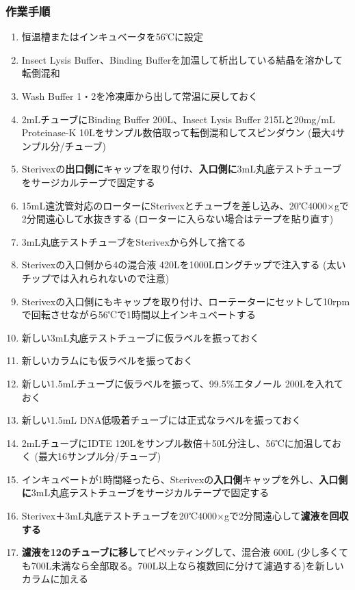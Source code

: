 \documentclass[titlepage,10pt,a4paper,uplatex]{jsbook}
\renewcommand{\textbf}[1]{{\bfseries\sffamily#1}}
\begin{document}
\subsubsection{作業手順}
\begin{enumerate}
\item 恒温槽またはインキュベータを56℃に設定
\item Insect Lysis Buffer、Binding Bufferを加温して析出している結晶を溶かして転倒混和
\item Wash Buffer 1・2を冷凍庫から出して常温に戻しておく
\item 2mLチューブにBinding Buffer 200{\textmu}L、Insect Lysis Buffer 215{\textmu}Lと20mg/mL Proteinase-K 10{\textmu}Lをサンプル数倍取って転倒混和してスピンダウン (最大4サンプル分/チューブ)
\item Sterivexの\textbf{出口側に}キャップを取り付け、\textbf{入口側に}3mL丸底テストチューブをサージカルテープで固定する
\item 15mL遠沈管対応のローターにSterivexとチューブを差し込み、20℃4000×gで2分間遠心して水抜きする (ローターに入らない場合はテープを貼り直す)
\item 3mL丸底テストチューブをSterivexから外して捨てる
\item Sterivexの入口側から4の混合液 420{\textmu}Lを1000{\textmu}Lロングチップで注入する (太いチップでは入れられないので注意)
\item Sterivexの入口側にもキャップを取り付け、ローテーターにセットして10rpmで回転させながら56℃で1時間以上インキュベートする
\item 新しい3mL丸底テストチューブに仮ラベルを振っておく
\item 新しいカラムにも仮ラベルを振っておく
\item 新しい1.5mLチューブに仮ラベルを振って、99.5\%エタノール 200{\textmu}Lを入れておく
\item 新しい1.5mL DNA低吸着チューブには正式なラベルを振っておく
\item 2mLチューブにIDTE 120{\textmu}Lをサンプル数倍＋50{\textmu}L分注し、56℃に加温しておく (最大16サンプル分/チューブ)
\item インキュベートが1時間経ったら、Sterivexの\textbf{入口側}キャップを外し、\textbf{入口側に}3mL丸底テストチューブをサージカルテープで固定する
\item Sterivex＋3mL丸底テストチューブを20℃4000×gで2分間遠心して\textbf{濾液を回収する}
\item \textbf{濾液を12のチューブに移し}てピペッティングして、混合液 600{\textmu}L (少し多くても700{\textmu}L未満なら全部取る。700{\textmu}L以上なら複数回に分けて濾過する)を新しいカラムに加える

\end{enumerate}
\end{document}
